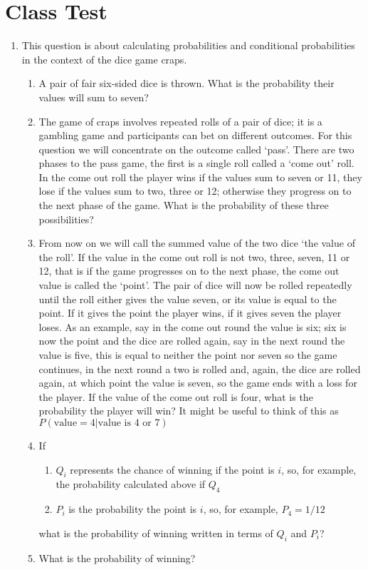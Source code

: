 \documentclass[11pt,a4paper]{scrartcl}
\begin{document}
\section*{Class Test}

\begin{enumerate}

\item This question is about calculating probabilities and conditional probabilities in the context of the dice game craps.

\begin{enumerate}
  \item A pair of fair six-sided dice is thrown. What is the probability their values will sum to seven?
  \item The game of craps involves repeated rolls of a pair of dice; it is a gambling game and participants can bet on different outcomes. For this question we will concentrate on the outcome called \lq{}pass\rq{}. There are two phases to the pass game, the first is a single roll called a \lq{}come out\rq{} roll. In the come out roll the player wins if the values sum to seven or 11, they lose if the values sum to two, three or 12; otherwise they progress on to the next phase of the game. What is the probability of these three possibilities?
  \item From now on we will call the summed value of the two dice \lq{}the value of the roll\rq{}. If the value in the come out roll is not two, three, seven, 11 or 12, that is if the game progresses on to the next phase, the come out value is called the \lq{}point\rq{}. The pair of dice will now be  rolled repeatedly until the roll either gives the value seven, or its value is equal to the point. If it gives the point the player wins, if it gives seven the player loses. As an example, say in the come out round the value is six; six is now the point and the dice are rolled again, say in the next round the value is five, this is equal to neither the point nor seven so the game continues, in the next round a two is rolled and, again, the dice are rolled again, at which point the value is seven, so the game ends with a loss for the player. If the value of the come out roll is four, what is the probability the player will win? It might be useful to think of this as $P(\mbox{value}=4|\mbox{value is 4 or 7})$
  \item If 
\begin{enumerate}
\item $Q_i$ represents the chance of winning if the point is $i$, so, for example, the probability calculated above if $Q_4$
\item $P_i$ is the probability the point is $i$, so, for example, $P_4=1/12$
\end{enumerate}
what is the probability of winning written in terms of $Q_i$ and $P_i$?
\item What is the probability of winning?
\end{enumerate}
  

\end{enumerate}
\end{document}
